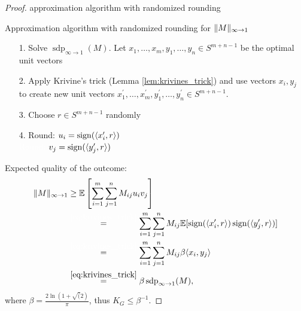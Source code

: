 \begin{proof}
	approximation algorithm with randomized rounding
	
	\begin{algorithm}[H]
		\SetAlgoLined
		\caption{Approximation algorithm with randomized rounding for $ \Vert {M} \Vert_{\infty\to 1}$}
	\end{algorithm}
	\begin{itemize}
		\item[1.] Solve $\operatorname{sdp}_{\infty\to 1} (M)$. Let $x_1,\dots,x_m,y_1,\dots,y_n\in S^{m+n-1}$ be the optimal unit vectors
		\item[2.] Apply Krivine's trick (Lemma \ref{lem:krivines_trick}) and use vectors $x_i,y_j$ to create new unit vectors $x_1^\prime,\dots,x_m^\prime, y_1^\prime,\dots,y_n^\prime\in S^{m+n-1}$.
		\item[3.] Choose $r\in S^{m+n-1}$ randomly
		\item[4.] Round: $u_i = \operatorname{sign}(\langle{x_i^\prime},{r}\rangle)$\\
					\textcolor{white}{Round: }$v_j = \operatorname{sign}(\langle{y_j^\prime},{r}\rangle)$
	\end{itemize}
	
	\noindent Expected quality of the outcome:
	\begin{align*}
		\norm{M}_{\infty\to 1} &\geq \mathbb{E}\left[\sum_{i=1}^m\sum_{j=1}^n M_{ij}u_iv_j\right]\\
		&\overset{\textcolor{white}{\eqref*{eq:krivines_trick}}}{=} \sum_{i=1}^m\sum_{j=1}^n M_{ij} \mathbb{E}[\sgn(\sclr{x_i^\prime}{r}) \sgn(\sclr{y_j^\prime}{r})] \\
		&\overset{\textcolor{white}{\eqref*{eq:krivines_trick}}}{=}\sum_{i=1}^m\sum_{j=1}^n M_{ij}\beta \sclr{x_i}{y_j} \\
		&\overset{\eqref{eq:krivines_trick}}{=}\beta \operatorname{sdp}_{\infty\to 1}(M),
	\end{align*}
	where $\beta = \frac{2\ln(1+\sqrt(2)}{\pi}$, thus $K_G\leq \beta^{-1}$.
\end{proof}

